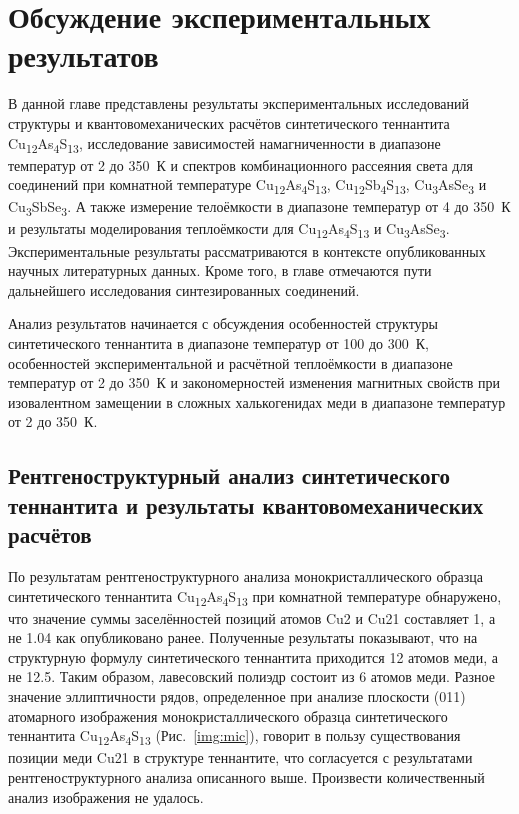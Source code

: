 \chapter{Обсуждение экспериментальных результатов} \label{chapt4}
В данной главе представлены результаты экспериментальных исследований структуры и квантовомеханических расчётов синтетического теннантита Cu\textsubscript{12}As\textsubscript{4}S\textsubscript{13}, исследование зависимостей намагниченности в диапазоне температур от 2 до 350~К и спектров комбинационного рассеяния света для соединений при комнатной температуре Cu\textsubscript{12}As\textsubscript{4}S\textsubscript{13}, Cu\textsubscript{12}Sb\textsubscript{4}S\textsubscript{13}, Cu\textsubscript{3}AsSe\textsubscript{3} и Cu\textsubscript{3}SbSe\textsubscript{3}. А также измерение телоёмкости в диапазоне температур от 4 до 350~К и результаты моделирования теплоёмкости для Cu\textsubscript{12}As\textsubscript{4}S\textsubscript{13} и Cu\textsubscript{3}AsSe\textsubscript{3}.
Экспериментальные результаты рассматриваются в контексте опубликованных научных литературных данных. Кроме того, в главе отмечаются пути дальнейшего исследования синтезированных соединений.

Анализ результатов начинается с обсуждения особенностей структуры синтетического теннантита в диапазоне температур от 100 до 300~К, особенностей экспериментальной и расчётной теплоёмкости в диапазоне температур от 2 до 350~К и закономерностей изменения магнитных свойств при изовалентном замещении в сложных халькогенидах меди в диапазоне температур от 2 до 350~К.

\section{Рентгеноструктурный анализ синтетического теннантита и результаты квантовомеханических расчётов} \label{sect4_1}

По результатам рентгеноструктурного анализа монокристаллического образца синтетического теннантита Cu\textsubscript{12}As\textsubscript{4}S\textsubscript{13} при комнатной температуре обнаружено, что значение суммы заселённостей позиций атомов Cu2 и Cu21 составляет 1, а не 1.04 как опубликовано ранее\cite{Makovicky_2006}.
Полученные результаты показывают, что на структурную формулу синтетического теннантита приходится 12 атомов меди, а не 12.5.
Таким образом, лавесовский полиэдр состоит из 6 атомов меди.
Разное значение эллиптичности рядов, определенное при анализе плоскости (011) атомарного изображения монокристаллического образца синтетического теннантита Cu\textsubscript{12}As\textsubscript{4}S\textsubscript{13} (Рис.~\ref{img:mic}), говорит в пользу существования позиции меди Cu21 в структуре теннантите, что согласуется с результатами рентгеноструктурного анализа описанного выше. Произвести количественный анализ изображения не удалось.



